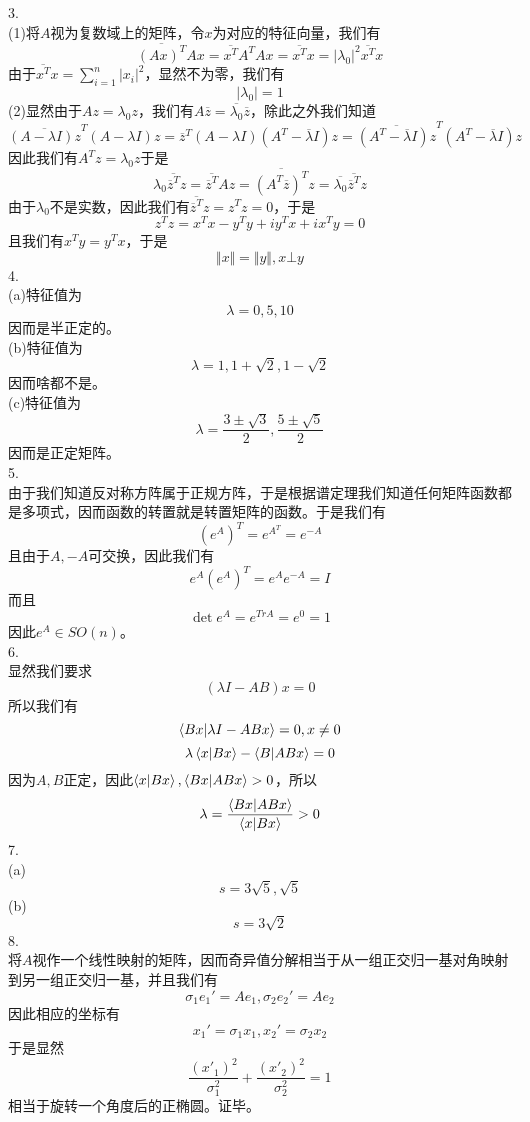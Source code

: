 \documentclass[utf8]{ctexart}
\begin{document}
3.\\
(1)将$A$视为复数域上的矩阵，令$x$为对应的特征向量，我们有
\[\overline{(Ax)^T}Ax=\overline{x^T}A^TAx=\overline{x^T}x=|\lambda_0|^2\overline{x^T}x\]
由于$\overline{x^T}x=\sum\limits_{i=1}^n|x_i|^2$，显然不为零，我们有
\[|\lambda_0|=1\]
(2)显然由于$Az=\lambda_0z$，我们有$A\overline{z}=\overline{\lambda_0}\overline{z}$，除此之外我们知道
\[\overline{(A-\lambda I)z}^T(A-\lambda I)z=\overline{z}^T(A-\lambda I)(A^T-\overline{\lambda}I)z=\overline{(A^T-\overline{\lambda}I)z}^T(A^T-\overline{\lambda} I)z\]
因此我们有$A^Tz=\lambda_0z$于是
\[\lambda_0\overline{\overline{z}^T}z=\overline{\overline{z}^T}Az=\overline{(A^T\overline{z})^T}z=\overline{\lambda_0}\overline{\overline{z}^T}z\]
由于$\lambda_0$不是实数，因此我们有$\overline{\overline{z}^T}z=z^Tz=0$，于是
\[z^Tz=x^Tx-y^Ty+iy^Tx+ix^Ty=0\]
且我们有$x^Ty=y^Tx$，于是
\[\Vert x\Vert=\Vert y\Vert,x\bot y\]
4.\\
(a)特征值为
\[\lambda=0,5,10\]
因而是半正定的。\\
(b)特征值为
\[\lambda=1,1+\sqrt{2},1-\sqrt{2}\]
因而啥都不是。\\
(c)特征值为
\[\lambda=\frac{3\pm\sqrt{3}}{2},\frac{5\pm\sqrt{5}}{2}\]
因而是正定矩阵。\\
5.\\
由于我们知道反对称方阵属于正规方阵，于是根据谱定理我们知道任何矩阵函数都是多项式，因而函数的转置就是转置矩阵的函数。于是我们有
\[(e^A)^T=e^{A^T}=e^{-A}\]
且由于$A,-A$可交换，因此我们有
\[e^{A}(e^A)^T=e^Ae^{-A}=I\]
而且
\[\det e^A=e^{TrA}=e^0=1\]
因此$e^A\in SO(n)$。\\
6.\\
显然我们要求
\[(\lambda I-AB)x=0\]
所以我们有
\[\braket{Bx|\lambda I-ABx}=0,x\neq0\]
\[\lambda\braket{x|Bx}-\braket{B|ABx}=0\]
因为$A,B$正定，因此$\braket{x|Bx},\braket{Bx|ABx}>0$，所以
\[\lambda=\frac{\braket{Bx|ABx}}{\braket{x|Bx}}>0\]
7.\\
(a)\[s=3\sqrt{5},\sqrt{5}\]
(b)\[s=3\sqrt{2}\]
8.\\
将$A$视作一个线性映射的矩阵，因而奇异值分解相当于从一组正交归一基对角映射到另一组正交归一基，并且我们有
\[\sigma_1e_1'=Ae_1,\sigma_2e_2'=Ae_2\]
因此相应的坐标有
\[x_1'=\sigma_1x_1,x_2'=\sigma_2x_2\]
于是显然
\[\frac{(x'_1)^2}{\sigma_1^2}+\frac{(x'_2)^2}{\sigma_2^2}=1\]
相当于旋转一个角度后的正椭圆。证毕。
\end{document}

